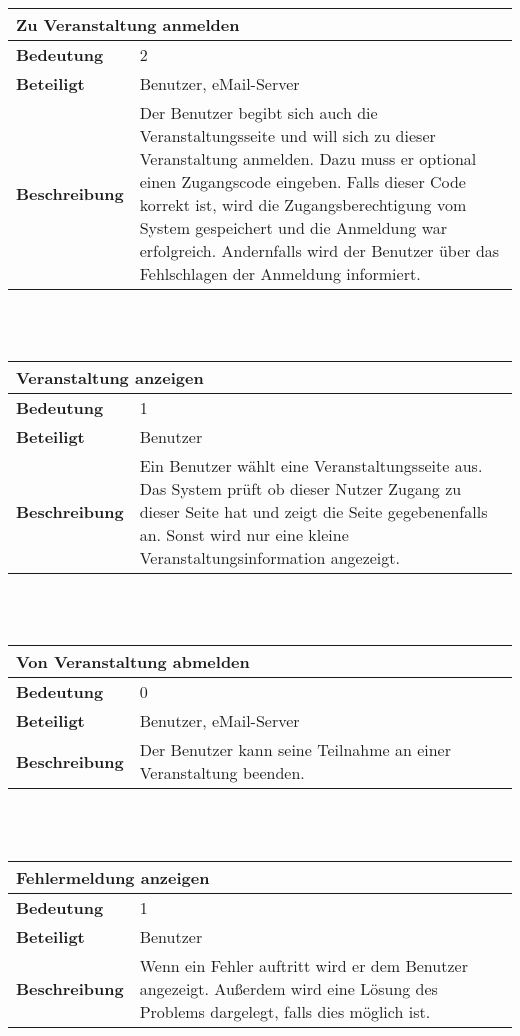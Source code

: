 \documentclass[12pt,a4paper]{article}
\begin{document}
\begin{tabular}{l p{10cm}}
\multicolumn{2}{l}{\textbf{Zu Veranstaltung anmelden}} \\ \hline
\textbf{Bedeutung} & 2 \\ \hline 
\textbf{Beteiligt} & Benutzer, eMail-Server \\ \hline 
\textbf{Beschreibung} & Der Benutzer begibt sich auch die Veranstaltungsseite und will sich zu dieser Veranstaltung anmelden. Dazu muss er optional einen Zugangscode eingeben. Falls dieser Code korrekt ist, wird die Zugangsberechtigung vom System gespeichert und die Anmeldung war erfolgreich. Andernfalls wird der Benutzer über das Fehlschlagen der Anmeldung informiert. \\ 
\hline 
\end{tabular}\\\\

\begin{tabular}{l p{10cm}}
\multicolumn{2}{l}{\textbf{Veranstaltung anzeigen}} \\ \hline
\textbf{Bedeutung} & 1 \\ \hline 
\textbf{Beteiligt} & Benutzer \\ \hline 
\textbf{Beschreibung} & Ein Benutzer wählt eine Veranstaltungsseite aus. Das System prüft ob dieser Nutzer Zugang zu dieser Seite hat und zeigt die Seite gegebenenfalls an. Sonst wird nur eine kleine Veranstaltungsinformation angezeigt. \\ 
\hline 
\end{tabular}\\\\

\begin{tabular}{l p{10cm}}
\multicolumn{2}{l}{\textbf{Von Veranstaltung abmelden}} \\ \hline
\textbf{Bedeutung} & 0 \\ \hline 
\textbf{Beteiligt} & Benutzer, eMail-Server \\ \hline 
\textbf{Beschreibung} & Der Benutzer kann seine Teilnahme an einer Veranstaltung beenden. \\ 
\hline 
\end{tabular}\\\\

\begin{tabular}{l p{10cm}}
\multicolumn{2}{l}{\textbf{Fehlermeldung anzeigen}} \\ \hline
\textbf{Bedeutung} & 1 \\ \hline 
\textbf{Beteiligt} & Benutzer \\ \hline 
\textbf{Beschreibung} & Wenn ein Fehler auftritt wird er dem Benutzer angezeigt. Außerdem wird eine Lösung des Problems dargelegt, falls dies möglich ist. \\ 
\hline 
\end{tabular}\\\\
\end{document}
